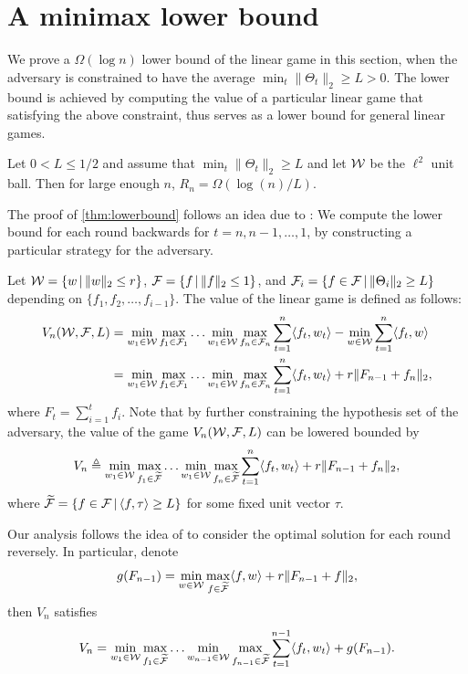 \appendix
{}
\section{A minimax lower bound}
We prove a $\Omega(\log n)$ lower bound of the linear game in this section, when the adversary is constrained to have the average $\min_t \|\Theta_t\|_2 \ge L >0$.
The lower bound is achieved by computing the value of a particular linear game that satisfying the above constraint, thus serves as a lower bound for general linear games.

\begin{thm}
	Let $0<L\le 1/2$ and
	assume that $\min_t \|\Theta_t\|_2\ge L$ and let $\mathcal{W}$ be the $\ell^2$ unit ball.
	Then for large enough $n$, $R_n = \Omega(\log (n)/L)$.
\end{thm}
The proof of \cref{thm:lowerbound} follows an idea due to \citet{abernethy2008optimal}: We compute the lower bound for each round backwards for $t=n,n-1,\dots,1$, by constructing a particular strategy for the adversary.

Let $\mathcal{W}=\left\{w \,\vert\, \|w\|_2 \le r \right\}$, $\mathcal{F} = \left\{f \,\vert\, \|f\|_2\le 1 \right\}$, and $\mathcal{F}_i = \left\{f\in\mathcal{F} \,\vert\, \|\Theta_i\|_2\ge L \right\}$ depending on $\{f_1, f_2, \ldots, f_{i-1}\}$. 
The value of the linear game is defined as follows:
\begin{align*}
V_n(\mathcal{W}, \mathcal{F}, L) & = \min_{w_1\in\mathcal{W}}\max_{f_1\in\mathcal{F}_1}\ldots\min_{w_1\in\mathcal{W}}\max_{f_n\in\mathcal{F}_n} \sum_{t=1}^{n} \langle f_t, w_t\rangle - \min_{w\in\mathcal{W}} \sum_{t=1}^{n} \langle f_t, w\rangle \\
& = \min_{w_1\in\mathcal{W}}\max_{f_1\in\mathcal{F}_1}\ldots\min_{w_1\in\mathcal{W}}\max_{f_n\in\mathcal{F}_n} \sum_{t=1}^{n} \langle f_t, w_t\rangle +r \|F_{n-1} + f_n\|_2,
\end{align*}
where $F_t = \sum_{i=1}^{t}f_i$. 
Note that by further constraining the hypothesis set of the adversary, the value of the game $V_n(\mathcal{W}, \mathcal{F}, L)$ can be lowered bounded by 
\[
V_n \triangleq \min_{w_1\in\mathcal{W}}\max_{f_1\in\widetilde{\mathcal{F}}}\ldots\min_{w_1\in\mathcal{W}}\max_{f_n\in\widetilde{\mathcal{F}}} \sum_{t=1}^{n} \langle f_t, w_t\rangle +r \|F_{n-1} + f_n\|_2,
\]
where $\widetilde{\mathcal{F}} = \left\{f\in\mathcal{F} \,\vert\, \langle f, \tau\rangle \ge L \right\}$ for some fixed unit vector $\tau$.

Our analysis follows the idea of \citep{abernethy2008optimal} to consider the optimal solution for each round reversely.
In particular, denote 
\[
g(F_{n-1}) = \min_{w\in\mathcal{W}}\max_{f\in\widetilde{\mathcal{F}}} \langle f, w\rangle +r \|F_{n-1} + f\|_2,
\] 
then $V_n$ satisfies
\[
V_n = \min_{w_1\in\mathcal{W}}\max_{f_1\in\widetilde{\mathcal{F}}}\ldots\min_{w_{n-1}\in\mathcal{W}}\max_{f_{n-1}\in\widetilde{\mathcal{F}}} \sum_{t=1}^{n-1} \langle f_t, w_t\rangle + g(F_{n-1}).
\]

